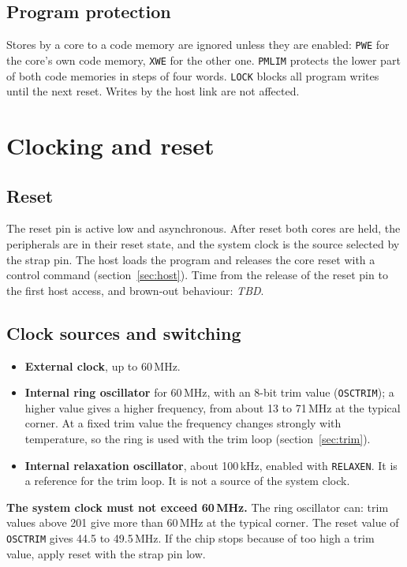 \documentclass[10pt,a4paper]{article}
\newcommand{\reg}[1]{\texttt{#1}}
\newcommand{\tbd}{\textcolor{black!50}{\textit{TBD}}}
\begin{document}
\subsection{Program protection}

Stores by a core to a code memory are ignored unless they are enabled: \reg{PWE} for the core's own code memory,
\reg{XWE} for the other one. \reg{PMLIM} protects the lower part of both code memories in steps of four words.
\reg{LOCK} blocks all program writes until the next reset. Writes by the host link are not affected.



\section{Clocking and reset}\label{sec:clk}

\subsection{Reset}

The reset pin is active low and asynchronous. After reset both cores are held, the peripherals are in their
reset state, and the system clock is the source selected by the strap pin. The host loads the program and
releases the core reset with a control command (section~\ref{sec:host}). Time from the release of the reset pin
to the first host access, and brown-out behaviour: \tbd.

\subsection{Clock sources and switching}

\begin{itemize}
\item \textbf{External clock}, up to 60\,MHz.
\item \textbf{Internal ring oscillator} for 60\,MHz, with an 8-bit trim value (\reg{OSCTRIM}); a higher value gives
a higher frequency, from about 13 to 71\,MHz at the typical corner. At a fixed trim value the frequency changes
strongly with temperature, so the ring is used with the trim loop (section~\ref{sec:trim}).
\item \textbf{Internal relaxation oscillator}, about 100\,kHz, enabled with \reg{RELAXEN}. It is a reference for
the trim loop. It is not a source of the system clock.
\end{itemize}

\textbf{The system clock must not exceed 60\,MHz.} The ring oscillator can: trim values above 201 give
more than 60\,MHz at the typical corner. The reset value of \reg{OSCTRIM} gives 44.5 to 49.5\,MHz. If the chip stops
because of too high a trim value, apply reset with the strap pin low.
\end{document}
